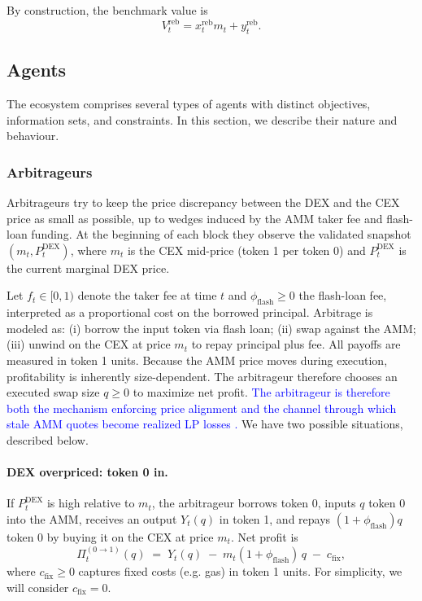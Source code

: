 \documentclass[11pt]{article}
\begin{document}
By construction, the benchmark value is
\begin{equation}
  V_t^{\mathrm{reb}} = x_t^{\mathrm{reb}} m_t + y_t^{\mathrm{reb}}.
\end{equation}

\subsection{Agents}
\label{sec:agents}

The ecosystem comprises several types of agents with distinct objectives, information sets, and constraints. In this section, we describe their nature and behaviour.

\subsubsection{Arbitrageurs}

Arbitrageurs try to keep the price discrepancy between the DEX and the CEX price as small as possible, up to wedges induced by the AMM taker fee and flash-loan funding.
At the beginning of each block they observe the validated snapshot $(m_t, P_t^{\mathrm{DEX}})$,
where $m_t$ is the CEX mid-price (token 1 per token 0) and $P_t^{\mathrm{DEX}}$ is the current
marginal DEX price.

Let $f_t\in[0,1)$ denote the taker fee at time $t$ and $\phi_{\mathrm{flash}}\ge 0$ the flash-loan fee,
interpreted as a proportional cost on the borrowed principal. Arbitrage is modeled as:
(i) borrow the input token via flash loan; (ii) swap against the AMM; (iii) unwind on the CEX at price
$m_t$ to repay principal plus fee. All payoffs are measured in token 1 units.
Because the AMM price moves during execution, profitability is inherently size-dependent.
The arbitrageur therefore chooses an executed swap size $q\ge 0$ to maximize net profit. \textcolor{blue}{The arbitrageur is therefore both the mechanism enforcing price alignment and the channel through which stale AMM quotes become realized LP losses \cite{angeris2020,milionis2023,fritsch2024,cartea2022execution}.} We have two possible situations, described below.


\paragraph{DEX overpriced: token 0 in.}
If $P_t^{\mathrm{DEX}}$ is high relative to $m_t$, the arbitrageur borrows token 0, inputs
$q$ token 0 into the AMM, receives an output $Y_t(q)$ in token 1, and repays $(1+\phi_{\mathrm{flash}})q$
token 0 by buying it on the CEX at price $m_t$.
Net profit is
\begin{equation}
  \Pi_t^{(0\rightarrow 1)}(q)
  \;=\;
  Y_t(q) \;-\; m_t(1+\phi_{\mathrm{flash}})\,q \;-\; c_{\mathrm{fix}},
  \label{eq:arb-profit-0in}
\end{equation}
where $c_{\mathrm{fix}}\ge 0$ captures fixed costs (e.g. gas) in token 1 units. For simplicity, we will
consider $c_{\mathrm{fix}} = 0$. 
\end{document}
